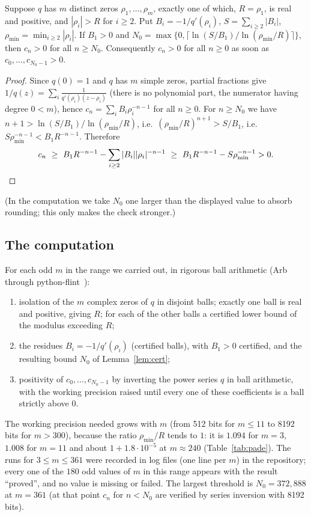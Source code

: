 \begin{lemma}\label{lem:cert}
Suppose $q$ has $m$ distinct zeros $\rho_1,\dots,\rho_m$, exactly one of which, $R=\rho_1$, is real and positive, and $|\rho_i|>R$ for $i\ge2$. Put $B_i=-1/q'(\rho_i)$, $S=\sum_{i\ge2}|B_i|$, $\rho_{\min}=\min_{i\ge2}|\rho_i|$. If $B_1>0$ and $N_0=\max\{0,\lceil\ln(S/B_1)/\ln(\rho_{\min}/R)\rceil\}$, then $c_n>0$ for all $n\ge N_0$. Consequently $c_n>0$ for all $n\ge0$ as soon as $c_0,\dots,c_{N_0-1}>0$.
\end{lemma}
\begin{proof}
Since $q(0)=1$ and $q$ has $m$ simple zeros, partial fractions give $1/q(z)=\sum_i \frac{1}{q'(\rho_i)(z-\rho_i)}$ (there is no polynomial part, the numerator having degree $0<m$), hence $c_n=\sum_iB_i\rho_i^{-n-1}$ for all $n\ge0$. For $n\ge N_0$ we have $n+1>\ln(S/B_1)/\ln(\rho_{\min}/R)$, i.e.\ $(\rho_{\min}/R)^{n+1}>S/B_1$, i.e.\ $S\rho_{\min}^{-n-1}<B_1R^{-n-1}$. Therefore
\[
c_n\ \ge\ B_1R^{-n-1}-\sum_{i\ge2}|B_i||\rho_i|^{-n-1}\ \ge\ B_1R^{-n-1}-S\rho_{\min}^{-n-1}>0 .\qedhere
\]
\end{proof}
(In the computation we take $N_0$ one larger than the displayed value to absorb rounding; this only makes the check stronger.)

\subsection{The computation}
For each odd $m$ in the range we carried out, in rigorous ball arithmetic (Arb through python-flint~\cite{Arb}):
\begin{enumerate}[leftmargin=2em]
\item isolation of the $m$ complex zeros of $q$ in disjoint balls; exactly one ball is real and positive, giving $R$; for each of the other balls a certified lower bound of the modulus exceeding $R$;
\item the residues $B_i=-1/q'(\rho_i)$ (certified balls), with $B_1>0$ certified, and the resulting bound $N_0$ of Lemma~\ref{lem:cert};
\item positivity of $c_0,\dots,c_{N_0-1}$ by inverting the power series $q$ in ball arithmetic, with the working precision raised until every one of these coefficients is a ball strictly above $0$.
\end{enumerate}
The working precision needed grows with $m$ (from 512 bits for $m\le11$ to 8192 bits for $m>300$), because the ratio $\rho_{\min}/R$ tends to $1$: it is $1.094$ for $m=3$, $1.008$ for $m=11$ and about $1+1.8\cdot10^{-5}$ at $m\approx 240$ (Table~\ref{tab:pade}). The runs for $3\le m\le 361$ were recorded in log files (one line per $m$) in the repository; every one of the $180$ odd values of $m$ in this range appears with the result ``proved'', and no value is missing or failed. The largest threshold is $N_0=372{,}888$ at $m=361$ (at that point $c_n$ for $n<N_0$ are verified by series inversion with 8192 bits).

